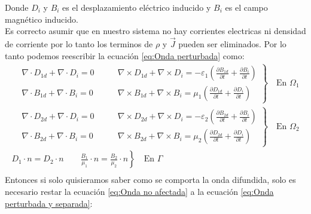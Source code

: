 \documentclass[11pt]{article}
\begin{document}
Donde $D_i$ y $B_i$ es el desplazamiento eléctrico inducido y $B_i$ es el campo magnético inducido.\\
Es correcto asumir que en nuestro sistema no hay corrientes electricas ni densidad de corriente por lo tanto los terminos de $\rho$ y $\vec{J}$ pueden ser eliminados. Por lo tanto podemos reescribir la ecuación \eqref{eq:Onda perturbada} como:
\begin{equation}
\label{eq:Onda perturbada y separada}
\begin{split}
\left.
\begin{aligned}
&\nabla\cdot D_{1d} + \nabla\cdot D_{i} = 0\qquad & \nabla\times D_{1d}+\nabla\times D_i = -\varepsilon_1\left(\frac{\partial B_{1d}}{\partial t}+\frac{\partial B_i}{\partial t}\right)\\
&\nabla\cdot B_{1d} +\nabla\cdot B_i = 0\qquad &  \nabla\times B_{1d}+\nabla\times B_i = \mu_1\left(\frac{\partial D_{1d}}{\partial t}+\frac{\partial D_i}{\partial t}\right)
\end{aligned}
\right\}
\quad\text{En }\Omega_1\\
\left.
\begin{aligned}
&\nabla\cdot D_{2d} + \nabla\cdot D_{i} = 0\qquad & \nabla\times D_{2d}+\nabla\times D_i = -\varepsilon_2\left(\frac{\partial B_{2d}}{\partial t}+\frac{\partial B_i}{\partial t}\right)\\
&\nabla\cdot B_{2d} +\nabla\cdot B_i = 0\qquad &  \nabla\times B_{2d}+\nabla\times B_i = \mu_2\left(\frac{\partial D_{2d}}{\partial t}+\frac{\partial D_i}{\partial t}\right)
\end{aligned}
\right\}
\quad\text{En }\Omega_2\\
\left. 
D_1\cdot n=D_2\cdot n \qquad \frac{B_1}{\mu_1}\cdot n=\frac{B_2}{\mu_2}\cdot n
\right\}
\quad\text{En }\Gamma\\
\end{split}
\end{equation}
Entonces si solo quisieramos saber como se comporta la onda difundida, solo es necesario restar la ecuación \eqref{eq:Onda no afectada} a la ecuación \eqref{eq:Onda perturbada y separada}:
\end{document}
